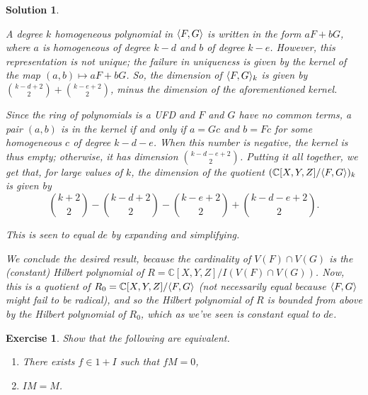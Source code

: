 \documentclass{article}
\newtheorem{ex}{Exercise}
\theoremstyle{nonumberplain}
\newtheorem{sol}{Solution}
\newcommand{\C}{\mathbb{C}}
\DeclarePairedDelimiter{\braket}{\langle}{\rangle}
\begin{document}
\begin{sol}
\begin{enumerate}
A degree $k$ homogeneous polynomial in $\braket{F,G}$ is written in the form $a F + b G$, where $a$ is homogeneous of degree $k-d$ and $b$ of degree $k-e$. However, this representation is not unique; the failure in uniqueness is given by the kernel of the map $(a,b) \mapsto aF+bG$. So, the dimension of $\braket{F,G}_k$ is given by $\binom{k-d+2}{2} + \binom{k-e+2}{2}$, minus the dimension of the aforementioned kernel.

Since the ring of polynomials is a UFD and $F$ and $G$ have no common terms, a pair $(a,b)$ is in the kernel if and only if $a = Gc$ and $b = Fc$ for some homogeneous $c$ of degree $k-d-e$. When this number is negative, the kernel is thus empty; otherwise, it has dimension $\binom{k-d-e+2}{2}$. Putting it all together, we get that, for large values of $k$, the dimension of the quotient $(\C[X,Y,Z]/\braket{F,G})_k$ is given by
\begin{equation}
\binom{k+2}{2} - \binom{k-d+2}{2} - \binom{k-e+2}{2} + \binom{k-d-e+2}{2}.
\end{equation}

This is seen to equal $de$ by expanding and simplifying.

\smallskip

We conclude the desired result, because the cardinality of $V(F)\cap V(G)$ is the (constant) Hilbert polynomial of $R = \C[X,Y,Z]/I(V(F) \cap V(G))$. Now, this is a quotient of $R_0 = \C[X,Y,Z]/\braket{F,G}$ (not necessarily equal because $\braket{F,G}$ might fail to be radical), and so the Hilbert polynomial of $R$ is bounded from above by the Hilbert polynomial of $R_0$, which as we've seen is constant equal to $de$.
\end{enumerate}
\end{sol}

\begin{ex}
Show that the following are equivalent.
\begin{enumerate}
\item There exists $f \in 1+I$ such that $fM = 0$,
\item $IM = M$.
\end{enumerate}
\end{ex}
\end{document}
